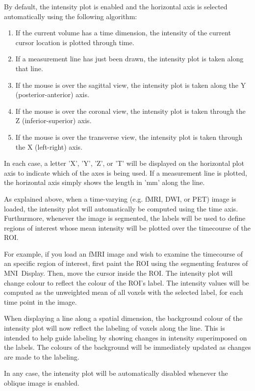 \documentclass[11pt,letterpaper]{article}
\newcommand{\display}{\mbox{MNI Display}}
\begin{document}
By default, the intensity plot is enabled and the horizontal axis is
selected automatically using the following algorithm:

\begin{enumerate}
\item If the current volume has a time dimension, the intensity of the
  current cursor location is plotted through time.
\item If a measurement line has just been drawn, the intensity plot is taken along that line.
\item If the mouse is over the sagittal view, the intensity plot is taken along the Y (posterior-anterior) axis.
\item If the mouse is over the coronal view, the intensity plot is taken through the Z (inferior-superior) axis.
\item If the mouse is over the transverse view, the intensity plot is taken through the X (left-right) axis.
\end{enumerate}

In each case, a letter 'X', 'Y', 'Z', or 'T' will be displayed on the
horizontal plot axis to indicate which of the axes is being used. If a
measurement line is plotted, the horizontal axis simply shows the
length in 'mm' along the line.

As explained above, when a time-varying (e.g. fMRI, DWI, or PET) image
is loaded, the intensity plot will automatically be computed using the
time axis. Furthurmore, whenever the image is segmented, the labels
will be used to define regions of interest whose mean intensity will
be plotted over the timecourse of the ROI.

For example, if you load an fMRI image and wish to examine the
timecourse of an specific region of interest, first paint the ROI
using the segmenting features of \display{}. Then, move the cursor
inside the ROI. The intensity plot will change colour to reflect the
colour of the ROI's label. The intensity values will be computed as
the unweighted mean of all voxels with the selected label, for each
time point in the image.

When displaying a line along a spatial dimension, the background colour
of the intensity plot will now reflect the labeling of voxels along the
line. This is intended to help guide labeling by showing changes in
intensity superimposed on the labels. The colours of the background will
be immediately updated as changes are made to the labeling.

In any case, the intensity plot will be automatically disabled
whenever the oblique image is enabled.
\end{document}
